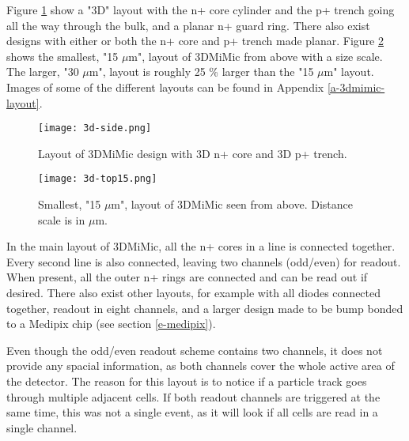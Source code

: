 \documentclass[../main/thesis.tex]{subfiles}
\begin{document}
Figure \ref{fig-3dmimic-side} show a "3D" layout with the n+ core cylinder and the p+ trench going all the way through the bulk, and a planar n+ guard ring. There also exist designs with either or both the n+ core and p+ trench made planar. Figure \ref{fig-3dmimic-top15} shows the smallest, "15 $\mu$m", layout of 3DMiMic from above with a size scale. The larger, "30 $\mu$m", layout is roughly 25 \% larger than the "15 $\mu$m" layout. Images of some of the different layouts can be found in Appendix \ref{a-3dmimic-layout}.

\begin{figure}%
	\centering
	\texttt{[image: 3d-side.png]}
	\caption{Layout of 3DMiMic design with 3D n+ core and 3D p+ trench. \citep{Marco}}
	\label{fig-3dmimic-side} %
\end{figure}

\begin{figure}%
	\centering
	\texttt{[image: 3d-top15.png]}
	\caption{Smallest, "15 $\mu$m", layout of 3DMiMic seen from above. Distance scale is in $\mu$m. \citep{Marco}}
	\label{fig-3dmimic-top15} %
\end{figure}

In the main layout of 3DMiMic, all the n+ cores in a line is connected together. Every second line is also connected, leaving two channels (odd/even) for readout. When present, all the outer n+ rings are connected and can be read out if desired. There also exist other layouts, for example with all diodes connected together, readout in eight channels, and a larger design made to be bump bonded to a Medipix chip (see section \ref{e-medipix}). 

Even though the odd/even readout scheme contains two channels, it does not provide any spacial information, as both channels cover the whole active area of the detector. The reason for this layout is to notice if a particle track goes through multiple adjacent cells. If both readout channels are triggered at the same time, this was not a single event, as it will look if all cells are read in a single channel.
\end{document}

